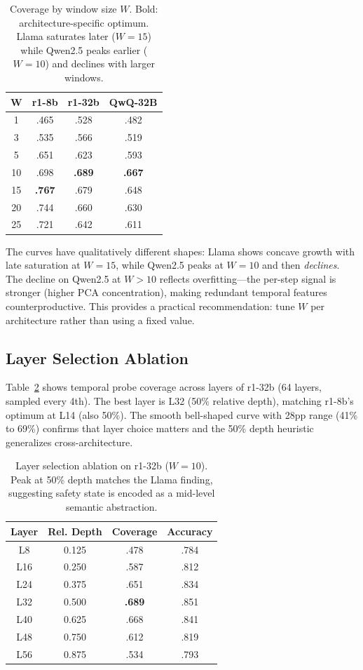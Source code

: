 \documentclass[11pt,a4paper]{article}
\begin{document}
\begin{table}[t]
\centering
\small
\begin{tabular}{cccc}
\toprule
\textbf{W} & \textbf{r1-8b} & \textbf{r1-32b} & \textbf{QwQ-32B} \\
\midrule
1 & .465 & .528 & .482 \\
3 & .535 & .566 & .519 \\
5 & .651 & .623 & .593 \\
10 & .698 & \textbf{.689} & \textbf{.667} \\
15 & \textbf{.767} & .679 & .648 \\
20 & .744 & .660 & .630 \\
25 & .721 & .642 & .611 \\
\bottomrule
\end{tabular}
\caption{Coverage by window size $W$. Bold: architecture-specific optimum. Llama saturates later ($W{=}15$) while Qwen2.5 peaks earlier ($W{=}10$) and declines with larger windows.}
\label{tab:window}
\end{table}

The curves have qualitatively different shapes: Llama shows concave growth with late saturation at $W{=}15$, while Qwen2.5 peaks at $W{=}10$ and then \emph{declines}. The decline on Qwen2.5 at $W{>}10$ reflects overfitting---the per-step signal is stronger (higher PCA concentration), making redundant temporal features counterproductive. This provides a practical recommendation: tune $W$ per architecture rather than using a fixed value.

\subsection{Layer Selection Ablation}
\label{sec:layer}

Table~\ref{tab:layer} shows temporal probe coverage across layers of r1-32b (64 layers, sampled every 4th). The best layer is L32 (50\% relative depth), matching r1-8b's optimum at L14 (also 50\%). The smooth bell-shaped curve with 28pp range (41\% to 69\%) confirms that layer choice matters and the 50\% depth heuristic generalizes cross-architecture.

\begin{table}[t]
\centering
\small
\begin{tabular}{cccc}
\toprule
\textbf{Layer} & \textbf{Rel. Depth} & \textbf{Coverage} & \textbf{Accuracy} \\
\midrule
L8 & 0.125 & .478 & .784 \\
L16 & 0.250 & .587 & .812 \\
L24 & 0.375 & .651 & .834 \\
L32 & 0.500 & \textbf{.689} & .851 \\
L40 & 0.625 & .668 & .841 \\
L48 & 0.750 & .612 & .819 \\
L56 & 0.875 & .534 & .793 \\
\bottomrule
\end{tabular}
\caption{Layer selection ablation on r1-32b ($W{=}10$). Peak at 50\% depth matches the Llama finding, suggesting safety state is encoded as a mid-level semantic abstraction.}
\label{tab:layer}
\end{table}
\end{document}
